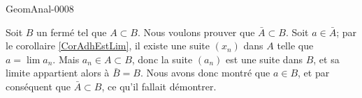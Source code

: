 \begin{corrige}{GeomAnal-0008}

	Soit $B$ un fermé tel que $A\subset B$. Nous voulons prouver que $\bar A\subset B$. Soit $a\in\bar A$; par le corollaire \ref{CorAdhEstLim}, il existe une suite $(x_n)$ dans $A$ telle que $a=\lim a_n$. Mais $a_n\in A\subset B$, donc la suite $(a_n)$ est une suite dans $B$, et sa limite appartient alors à $\bar B=B$. Nous avons donc montré que $a\in B$, et par conséquent que $\bar A\subset B$, ce qu'il fallait démontrer.

\end{corrige}
